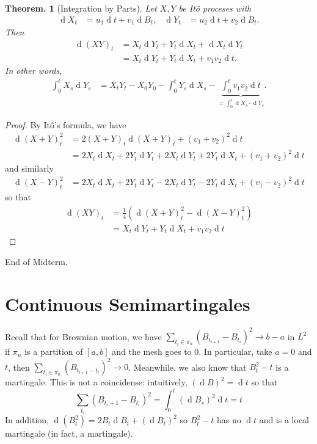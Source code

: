 \documentclass[11pt, a4paper]{memoir}
\theoremstyle{change}
\newtheorem{theorem}{Theorem.}[section]
\theoremstyle{plain}
\theoremstyle{nonumberplain}
\newtheorem{proof}{Proof}
\renewcommand{\d}[1]{\ensuremath{\operatorname{d}\!{#1}}}
\numberwithin{equation}{section}
\begin{document}
\begin{theorem}[Integration by Parts]
    Let $X,Y$ be Itô proceses with
    \begin{align*}
        \d{X_t}&=u_1\d{t}+v_1\d{B_t}, & \d{Y_t}&=u_2\d{t}+v_2\d{B_t}.
    \end{align*}
    Then
    \begin{align*}
        \d{(XY)_t}&=X_t\d{Y_t}+Y_t\d{X_t}+\d{X_t}\d{Y_t}\\
                  &= X_t\d{Y_t}+Y_t\d{X_t}+v_1v_2\d{t}.
    \end{align*}
    In other words,
    \begin{align*}
        \int_0^tX_s\d{Y_s} &= X_tY_t-X_0Y_0-\int_0^tY_s\d{X_s}-\underbrace{\int_0^tv_1v_2\d{t}}_{=\int_0^t\d{X_s}\cdot\d{Y_s}}.
    \end{align*}
\end{theorem}
\begin{proof}
    By Itô's formula, we have
    \begin{align*}
        \d{(X+Y)^2_t} &= 2(X+Y)_t\d{(X+Y)_t}+(v_1+v_2)^2\d{t}\\
                      &= 2X_t\d{X_t}+2Y_t\d{Y_t}+2X_t\d{Y_t}+2Y_t\d{X_t}+(v_1+v_2)^2\d{t}
    \end{align*}
    and similarly
    \begin{align*}
        \d{(X-Y)^2_t} &= 2X_t\d{X_t}+2Y_t\d{Y_t}-2X_t\d{Y_t}-2Y_t\d{X_t}+(v_1-v_2)^2\d{t}
    \end{align*}
    so that
    \begin{align*}
        \d{(XY)_t} &= \frac{1}{4}(\d{(X+Y)_t^2}-\d{(X-Y)_t^2})\\
                   &= X_t\d{Y_t}+Y_t\d{X_t}+v_1v_2\d{t}
    \end{align*}
\end{proof}
End of Midterm.
\section{Continuous Semimartingales}
Recall that for Brownian motion, we have $\sum_{t_i\in\pi_n}(B_{t_{i+1}}-B_{t_i})^2\to b-a$ in $L^2$ if $\pi_n$ is a partition of $[a,b]$ and the mesh goes to $0$.
In particular, take $a=0$ and $t$, then $\sum_{t_i\in\pi_n}(B_{t_{i+1}-t_i})^2\to 0$.
Meanwhile, we also know that $B_t^2-t$ is a martingale.
This is not a coincidense: intuitively, $(\d{B})^2=\d{t}$ so that
\begin{equation*}
    \sum_{t_i}(B_{t_i+1}-B_{t_i})^2=\int_0^t(\d{B_s})^2\d{t}=t
\end{equation*}
In addition, $\d{(B_t^2)}=2B_t\d{B_t}+(\d{B_t})^2$ so $B_t^2-t$ has no $\d{t}$ and is a local martingale (in fact, a martingale).
\end{document}

